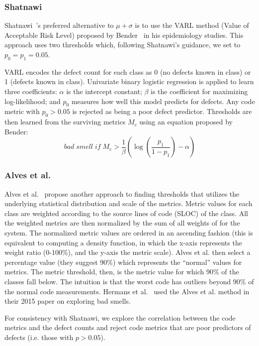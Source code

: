 \documentclass{sig-alternate}
\theoremstyle{break}
\begin{document}
\subsubsection{ Shatnawi}
Shatnawi~\cite{Shatnawi10}'s preferred alternative to $\mu+\sigma$
is to use the VARL method (Value of Acceptable Risk Level) proposed by Bender~\cite{bender99} in his epidemiology studies.  This approach uses two
thresholds which, following Shatnawi's guidance, we set to
$p_0=p_1=0.05$. 

VARL encodes the defect count
for each class as 0 (no defects known in class) or 1 (defects known in class).
Univariate binary logistic regression is applied to learn three coefficients:  
 $\alpha$ is the intercept constant;
    $\beta$ is the coefficient for maximizing log-likelihood;
  and $p_0$  
    measures   how well this   model predicts for   defects.
Any code metric with $p_0>0.05$ is  rejected as being a poor defect predictor. Thresholds are then learned from the surviving metrics $M_c$ using
an equation proposed by Bender:
\begin{equation}
 \mathit{bad\; smell\; if\;} M_c > \frac{1}{\beta }\left( {\log \left( {\frac{{{p_1}}}{{1 - {p_1}}}} \right) - \alpha } \right) 
\end{equation}

 
\subsubsection{ Alves et al.}
Alves et al.~\cite{Alves2010} propose another approach
to finding thresholds that  utilizes the underlying statistical distribution and scale of the metrics. 
Metric values for each class are weighted according to the source lines of code (SLOC) of the class. All the weighted metrics are then normalized by the sum of all weights of for the system. 
The normalized metric values are ordered in an ascending fashion (this is equivalent to computing a density function, in which the x-axis represents the weight ratio (0-100\%), and the y-axis the metric scale).
Alves et al. then select a percentage value (they suggest 90\%) which represents the ``normal'' values for metrics. The metric threshold, then, is the metric value for which 90\% of the classes fall below. The intuition  is that the worst code has outliers beyond 90\% of the normal code measurements. Hermans et al.~\cite{hermans15} used the
Alves et al. method in their  2015 paper on
exploring bad smells.

For consistency
with Shatnawi, we explore the correlation between
the code metrics and the defect counts and   reject code metrics that are poor predictors of defects (i.e.   those  with $p > 0.05$).
\end{document}
